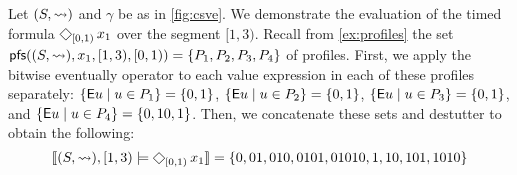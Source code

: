 

\begin{example} \label{ex:timed}
	Let $(S, {\rightsquigarrow})$ and $\gamma$ be as in \cref{fig:csve}.
	We demonstrate the evaluation of the timed formula $\LTLeventually_{[0,1)} x_1$ over the segment $[1,3)$.
	Recall from \cref{ex:profiles} the set $\mathsf{pfs}((S,{\rightsquigarrow}), x_1, [1,3), [0,1)) = \{P_1, P_2, P_3, P_4\}$ of profiles.
	First, we apply the bitwise eventually operator to each value expression in each of these profiles separately:
	$\{ \mathsf{E} u \st u \in P_1 \} = \{ 0, 1 \}$, $\{ \mathsf{E} u \st u \in P_2 \} = \{ 0, 1 \}$, $\{ \mathsf{E} u \st u \in P_3 \} = \{ 0, 1 \}$, and $\{ \mathsf{E} u \st u \in P_4 \} = \{ 0, 10, 1 \}$.
	Then, we concatenate these sets and destutter to obtain the following:
	\[ 	\llbracket (S, {\hb}), [1,3) \models \LTLeventually_{[0,1)} x_1 \rrbracket = \{ 0, 01, 010, 0101, 01010, 1, 10, 101, 1010 \}  \]
\end{example}

